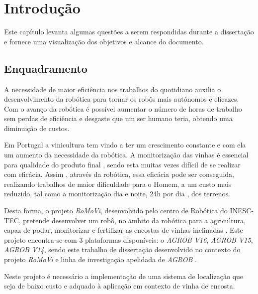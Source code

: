 \chapter{Introdução} \label{chap:introdução}
Este capítulo levanta algumas questões a serem respondidas durante a dissertação e fornece uma  visualização dos objetivos e alcance do documento.
 
\section{Enquadramento} \label{sec:enquadramento}
A necessidade de maior eficiência nos trabalhos do quotidiano auxilia o desenvolvimento da robótica para tornar os robôs mais  autónomos e eficazes. Com o avanço da robótica é possível aumentar o número de horas de trabalho sem perdas de eficiência e desgaste que um ser humano teria, obtendo uma diminuição de custos.

Em Portugal a vinicultura tem vindo a ter um crescimento constante e com ela um aumento da necessidade da robótica. A monitorização das vinhas é essencial para qualidade do produto final , sendo esta muitas vezes difícil de se realizar com eficácia. Assim , através da robótica, essa eficácia pode ser conseguida, realizando trabalhos de maior dificuldade para o Homem, a um custo mais reduzido, tal como a monitorização dia e noite, 24h por dia , dos terrenos. 

Desta forma, o projeto \textit{RoMoVi}, desenvolvido pelo centro de Robótica do INESC-TEC, pretende desenvolver um robô, no âmbito da robótica para a agricultura, capaz de podar, monitorizar e fertilizar as encostas de vinhas inclinadas \cite{Mendes2016}. Este projeto encontra-se com 3 plataformas disponíveis: o \textit{AGROB V16}, \textit{AGROB V15}, \textit{AGROB V14}, sendo este trabalho de dissertação desenvolvido no contexto do projeto \textit{RoMoVi} e linha de investigação apelidada de \textit{AGROB} \cite{RN32}.

Neste projeto é necessário a implementação de uma sistema de localização que seja de baixo custo e adquado à aplicação em contexto de vinha de encosta.

